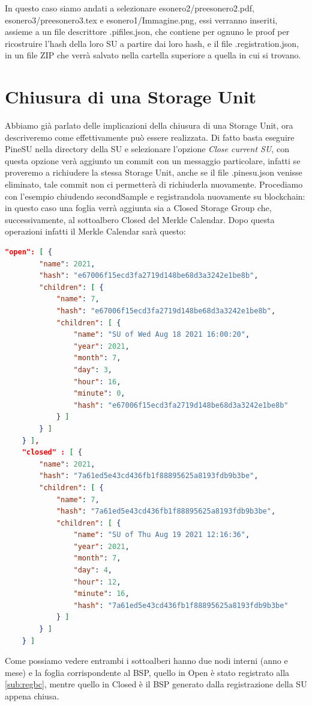 In questo caso siamo andati a selezionare \textsf{esonero2/preesonero2.pdf},
\textsf{esonero3/preesonero3.tex} e \textsf{esonero1/Immagine.png}, essi verranno inseriti,
assieme a un file descrittore \textsf{.pifiles.json}, che contiene per ognuno le proof
per ricostruire l’hash della loro SU a partire dai loro hash, e il file \textsf{.registration.json},
in un file ZIP che verrà salvato nella cartella superiore a quella in cui si trovano.

\section{Chiusura di una Storage Unit}
Abbiamo già parlato delle implicazioni della chiusura di una Storage Unit, ora descriveremo come
effettivamente può essere realizzata. Di fatto basta eseguire PineSU nella directory della SU e
selezionare l’opzione \emph{Close current SU}, con questa opzione verà aggiunto un commit con un
messaggio particolare, infatti se proveremo a richiudere la stessa Storage Unit, anche se
il file \textsf{.pinesu.json} venisse eliminato, tale commit non ci permetterà di richiuderla
nuovamente. Procediamo con l’esempio chiudendo \textsf{secondSample} e registrandola nuovamente
su blockchain: in questo caso una foglia verrà aggiunta sia a Closed Storage Group che,
successivamente, al sottoalbero Closed del Merkle Calendar.
Dopo questa operazioni infatti il Merkle Calendar sarà questo:
\begin{lstlisting}[language=json,firstnumber=1,basicstyle=\small]
    "open": [ {
        "name": 2021,
        "hash": "e67006f15ecd3fa2719d148be68d3a3242e1be8b",
        "children": [ {
            "name": 7,
            "hash": "e67006f15ecd3fa2719d148be68d3a3242e1be8b",
            "children": [ {
                "name": "SU of Wed Aug 18 2021 16:00:20",
                "year": 2021,
                "month": 7,
                "day": 3,
                "hour": 16,
                "minute": 0,
                "hash": "e67006f15ecd3fa2719d148be68d3a3242e1be8b"
            } ]
        } ]
    } ],
    "closed" : [ {
        "name": 2021,
        "hash": "7a61ed5e43cd436fb1f88895625a8193fdb9b3be",
        "children": [ {
            "name": 7,
            "hash": "7a61ed5e43cd436fb1f88895625a8193fdb9b3be",
            "children": [ {
                "name": "SU of Thu Aug 19 2021 12:16:36",
                "year": 2021,
                "month": 7,
                "day": 4,
                "hour": 12,
                "minute": 16,
                "hash": "7a61ed5e43cd436fb1f88895625a8193fdb9b3be"
            } ]
        } ]
    } ]  
\end{lstlisting}
Come possiamo vedere entrambi i sottoalberi hanno due nodi interni (anno e mese) e la foglia
corrispondente al BSP, quello in Open è stato registrato alla \autoref{sub:regbc}, mentre quello
in Closed è il BSP generato dalla registrazione della SU appena chiusa.

